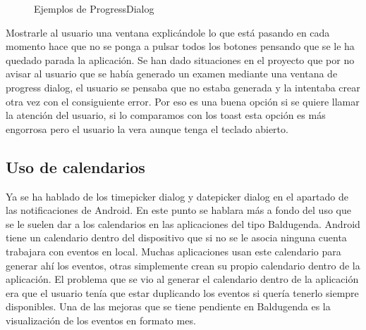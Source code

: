 \begin{figure}[H] 
  \begin{center} 
    \caption{Ejemplos de ProgressDialog} 
    \label{fig:ProgressDialog} 
  \end{center} 
\end{figure}

Mostrarle al usuario una ventana explicándole lo que está pasando en cada momento hace que no se ponga a pulsar todos los botones pensando que se le ha quedado parada la aplicación.
Se han dado situaciones en el proyecto que por no avisar al usuario que se había generado un examen mediante una ventana de progress dialog, el usuario se pensaba que no estaba generada y la intentaba crear otra vez con el consiguiente error. 
Por eso es una buena opción si se quiere llamar la atención del usuario, si lo comparamos con los toast esta opción es más engorrosa pero el usuario la vera aunque tenga el teclado abierto.

\subsection{Uso de calendarios}
\label{subsecc:Uso de calendarios}

Ya se ha hablado de los timepicker dialog y datepicker dialog en el apartado de las notificaciones de Android.
En este punto se hablara más a fondo del uso que se le suelen dar a los calendarios en las aplicaciones del tipo Baldugenda.
Android tiene un calendario dentro del dispositivo que si no se le asocia ninguna cuenta trabajara con eventos en local. Muchas aplicaciones usan este calendario para generar ahí los eventos, otras simplemente crean su propio calendario dentro de la aplicación.
El problema que se vio al generar el calendario dentro de la aplicación era que el usuario tenía que estar duplicando los eventos si quería tenerlo siempre disponibles.
Una de las mejoras que se tiene pendiente en Baldugenda es la visualización de los eventos en formato mes.

